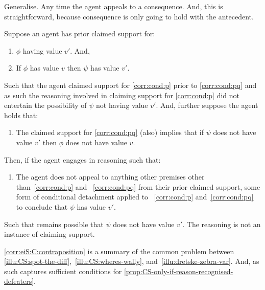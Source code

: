 \begin{note}
  Generalise.
  Any time the agent appeals to a consequence.
  And, this is straightforward, because consequence is only going to hold with the antecedent.

  \begin{corollary}\label{corr:eiS:C:contraposition}
    Suppose an agent has prior claimed support for:
    \begin{enumerate}[label=\arabic*., ref=(\arabic*)]
    \item\label{corr:cond:p} \(\phi\) having value \(v'\). And,
    \item\label{corr:cond:pq} If \(\phi\) has value \(v\) then \(\psi\) has value \(v'\).
  \end{enumerate}
  Such that the agent claimed support for \ref{corr:cond:p} prior to \ref{corr:cond:pq} and as such the reasoning involved in claiming support for \ref{corr:cond:p} did not entertain the possibility of \(\psi\) not having value \(v'\).
  And, further suppose the agent holds that:
  \begin{enumerate}[label=\arabic*., ref=(\arabic*), resume]
    \item The claimed support for \ref{corr:cond:pq} (also) implies that if \(\psi\) does not have value \(v'\) then \(\phi\) does not have value \(v\).
  \end{enumerate}
  Then, if the agent engages in reasoning such that:
    \begin{enumerate}[label=\arabic*., ref=(\arabic*), resume]
    \item The agent does not appeal to anything other premises other than~\ref{corr:cond:p} and ~\ref{corr:cond:pq} from their prior claimed support, some form of conditional detachment applied to ~\ref{corr:cond:p} and~\ref{corr:cond:pq} to conclude that \(\psi\) has value \(v'\).
    \end{enumerate}
    Such that remains possible that \(\psi\) does not have value \(v'\).
    The reasoning is not an instance of claiming support.
  \end{corollary}

  \autoref{corr:eiS:C:contraposition} is a summary of the common problem between  \ref{illu:CS:spot-the-diff},~\ref{illu:CS:wheres-wally}, and~\ref{illu:dretske-zebra-var}.
  And, as such captures sufficient conditions for \autoref{prop:CS-only-if-reason-recognised-defeaters}.
\end{note}

